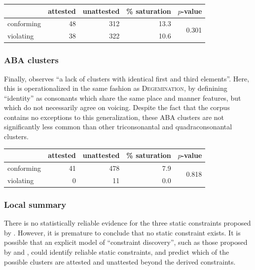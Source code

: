 \begin{example}
\begin{tabular}{l r r r r}
\toprule
           & attested & unattested & \% saturation & $p$-value              \\
\midrule
conforming & 48       & 312        & 13.3      & \multirow{2}{*}{0.301} \\
violating  & 38       & 322        & 10.6                               \\
\bottomrule
\end{tabular}
\end{example}

\subsubsection{ABA clusters}

Finally, \citet[][176]{Pierrehumbert1994} observes ``a lack of clusters with identical first and third elements''. Here, this is operationalized in the same fashion as \textsc{Degemination}, by definining ``identity'' as consonants which share the same place and manner features, but which do not necessarily agree on voicing. Despite the fact that the corpus contains no exceptions to this generalization, these \textsc{ABA} clusters are not significantly less common than other triconsonantal and quadraconsonantal clusters.

\begin{example}
\begin{tabular}{l r r r r}
\toprule
           & attested & unattested & \% saturation & $p$-value \\
\midrule
conforming & 41       & 478        & 7.9      & \multirow{2}{*}{0.818} \\
violating  &  0       &  11        & 0.0                               \\
\bottomrule
\end{tabular}
\end{example}

\subsubsection{Local summary}

There is no statistically reliable evidence for the three static constraints proposed by \citeauthor{Pierrehumbert1994}. However, it is premature to conclude that no static constraint exists. It is possible that an explicit model of ``constraint discovery'', such as those proposed by \citet{Pierrehumbert1994} and \citet{Hayes2008a}, could identify reliable static constraints, and predict which of the possible clusters are attested and unattested beyond the derived constraints. 


